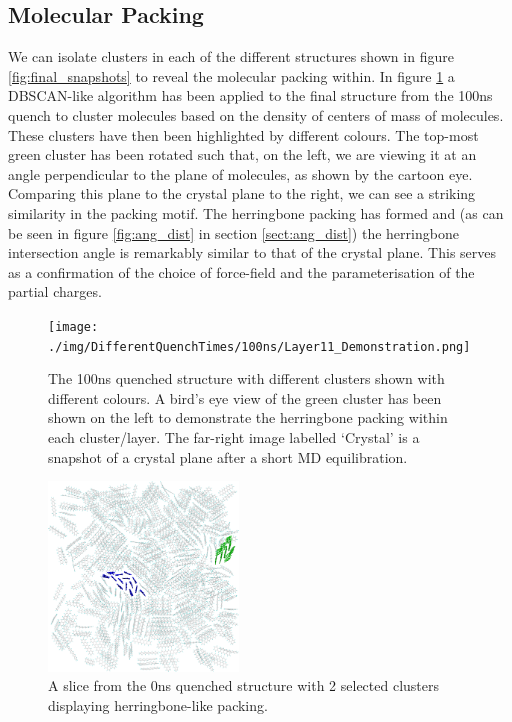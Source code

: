 \subsection{Molecular Packing}
\noindent We can isolate clusters in each of the different structures shown in figure \ref{fig:final_snapshots} to reveal the molecular packing within. In figure \ref{fig:Layer11} a DBSCAN\cite{DBSCAN}-like algorithm has been applied to the final structure from the 100ns quench to cluster molecules based on the density of centers of mass of molecules. These clusters have then been highlighted by different colours. The top-most green cluster has been rotated such that, on the left, we are viewing it at an angle perpendicular to the plane of molecules, as shown by the cartoon eye. Comparing this plane to the crystal plane to the right, we can see a striking similarity in the packing motif. The herringbone packing has formed and (as can be seen in figure \ref{fig:ang_dist} in section \ref{sect:ang_dist}) the herringbone intersection angle is remarkably similar to that of the crystal plane. This serves as a confirmation of the choice of force-field and the parameterisation of the partial charges.
\begin{figure}[ht]
	\texttt{[image: ./img/DifferentQuenchTimes/100ns/Layer11\_Demonstration.png]}
	\caption{\label{fig:Layer11}The 100ns quenched structure with different clusters shown with different colours. A bird's eye view of the green cluster has been shown on the left to demonstrate the herringbone packing within each cluster/layer. The far-right image labelled `Crystal' is a snapshot of a crystal plane after a short MD equilibration.}
\end{figure}
\begin{figure}
	\centering
	\includegraphics[width=0.45\textwidth]{./img/DifferentQuenchTimes/0ns/Slice6_4Clusters.png}
	\caption{\label{fig:ClustInst}A slice from the 0ns quenched structure with 2 selected clusters displaying herringbone-like packing.}
\end{figure}
